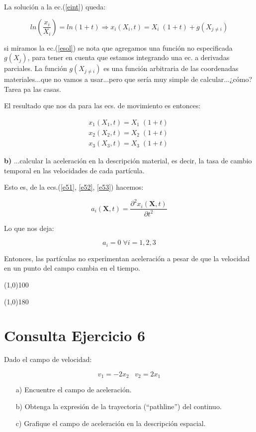 \documentclass[10pt,a4paper]{article}
\theoremstyle{definition}
\begin{document}
La solución a la ec.(\ref{eint}) queda:

\begin{equation} \label{esol}
ln(\dfrac{x_i}{X_i}) = ln(1+t) \Rightarrow x_i(X_i, t)  = X_i \; (1+t) + g(X_{j \neq i})
\end{equation}

\noindent si miramos la ec.(\ref{esol}) se nota que agregamos una función no especificada $g(X_j)$, para tener en cuenta que estamos integrando una ec. a derivadas parciales. La función $g(X_{j\neq i})$ es una función arbitraria de las coordenadas materiales...que no vamos a usar...pero que sería muy simple de calcular...¿cómo? Tarea pa las casas.

El resultado que nos da para las ecs. de movimiento es entonces:

\begin{eqnarray}
\label{e51} x_1(X_1, t)  = X_1 \; (1+t) \\
\label{e52} x_2(X_2, t)  = X_2 \; (1+t) \\
\label{e53} x_3(X_3, t)  = X_3 \; (1+t) \
\end{eqnarray}


\textbf{b)} ...calcular la aceleración en la descripción material, es decir, la tasa de cambio temporal en las velocidades de cada partícula.

Esto es, de la ecs.(\ref{e51}, \ref{e52}, \ref{e53}) hacemos:

\begin{equation} \label{eacel}
a_i(\mathbf{X}, t) = \dfrac{\partial^2 x_i(\mathbf{X}, t)}{\partial t^2}
\end{equation}

Lo que nos deja:

\begin{equation}
a_i = 0 \; \forall i= 1,2,3
\end{equation}


Entonces, las partículas no experimentan aceleración a pesar de que la velocidad en un punto del campo cambia en el tiempo.

\line(1,0){100}

\line(1,0){180}



\section*{Consulta Ejercicio 6}
Dado el campo de velocidad:

\begin{equation}\label{ee6}
 v_1=-2x_2 \; \; \; v_2=2x_1
\end{equation}
\begin{itemize}
\item[a)] Encuentre el campo de aceleraci\'on.
\item[b)] Obtenga la expresi\'on de la trayectoria (``pathline'') del continuo. 
\item[c)] Grafique el campo de aceleración en la descripción espacial.
\end{itemize}
\end{document}
